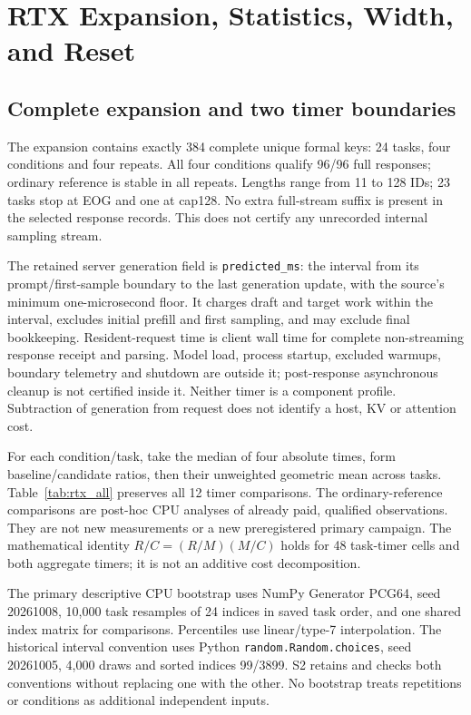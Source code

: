 \section{RTX Expansion, Statistics, Width, and Reset}
\label{supp:rtx_cost}
\subsection{Complete expansion and two timer boundaries}
The expansion contains exactly 384 complete unique formal keys: 24 tasks, four conditions and four repeats. All four conditions qualify 96/96 full responses; ordinary reference is stable in all repeats. Lengths range from 11 to 128 IDs; 23 tasks stop at EOG and one at cap128. No extra full-stream suffix is present in the selected response records. This does not certify any unrecorded internal sampling stream.

The retained server generation field is \texttt{predicted\_ms}: the interval from its prompt/first-sample boundary to the last generation update, with the source's minimum one-microsecond floor. It charges draft and target work within the interval, excludes initial prefill and first sampling, and may exclude final bookkeeping. Resident-request time is client wall time for complete non-streaming response receipt and parsing. Model load, process startup, excluded warmups, boundary telemetry and shutdown are outside it; post-response asynchronous cleanup is not certified inside it. Neither timer is a component profile. Subtraction of generation from request does not identify a host, KV or attention cost.

For each condition/task, take the median of four absolute times, form baseline/candidate ratios, then their unweighted geometric mean across tasks. Table~\ref{tab:rtx_all} preserves all 12 timer comparisons. The ordinary-reference comparisons are post-hoc CPU analyses of already paid, qualified observations. They are not new measurements or a new preregistered primary campaign. The mathematical identity $R/C=(R/M)(M/C)$ holds for 48 task-timer cells and both aggregate timers; it is not an additive cost decomposition.



The primary descriptive CPU bootstrap uses NumPy Generator PCG64, seed 20261008, 10,000 task resamples of 24 indices in saved task order, and one shared index matrix for comparisons. Percentiles use linear/type-7 interpolation. The historical interval convention uses Python \texttt{random.Random.choices}, seed 20261005, 4,000 draws and sorted indices 99/3899. S2 retains and checks both conventions without replacing one with the other. No bootstrap treats repetitions or conditions as additional independent inputs.

